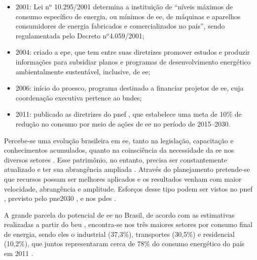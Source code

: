 \begin{itemize}
de 0,50\% da receita operacional líquida das operadoras.  Foi
realizado um investimento total em \glspl{pee} pelas concessionárias
do setor elétrico na quantia de $\text{R\$}$ 2 bilhões até o ano de
2006, onde se estima que o programa alcançou uma econômia média de
4.000 GWh/ano e retirando uma carga de ponta de consumo na ordem de
1.140 MW no período de 1998--2005;
\item 2001: Lei n$^\text{o}$ 10.295/2001 determina a instituição de
``níveis máximos de consumo específico de energia, ou mínimos de
\gls{ee}, de máquinas e aparelhos consumidores de energia fabricados e
comercializados no país'', sendo regulamentada pelo Decreto
n$^\text{o}$4.059/2001;
\item 2004: criado a \gls{epe}, que tem entre suas diretrizes promover
estudos e produzir informações para subsidiar planos e programas de
desenvolvimento energético ambientalmente sustentável, inclusive, de
\gls{ee};
\item 2006: início do \gls{proesco}, programa destinado a financiar
projetos de \gls{ee}, cuja coordenação executiva pertence ao
\gls{bndes};
\item 2011: publicado as diretrizes do \gls{pnef} \cite{pnef}, que
estabelece uma meta de 10\% de redução no consumo por meio de ações de
\gls{ee} no período de 2015--2030.
\end{itemize}

Percebe-se uma evolução brasileira em \gls{ee}, tanto na legislação,
capacitação e conhecimentos acumulados, quanto na coinsciência da
necessidade da \gls{ee} nos diversos setores \cite{pnef}.  Esse
patrimônio, no entanto, precisa ser constantemente atualizado e ter
sua abrangência ampliada \cite{pne30_eff_energ}. Através do
planejamento pretende-se que recursos possam ser melhores aplicados e
os resultados venham com maior velocidade, abrangência e amplitude.
Esforços desse tipo podem ser vistos no \gls{pnef} \cite{pnef},
previsto pelo \gls{pne2030} \cite{pne30_eff_energ}, e nos \glspl{pde}
\cite{pde_2020}.

A grande parcela do potencial de \gls{ee} no Brasil, de acordo com as
estimativas realizadas a partir do \gls{beu} \cite{beu}, encontra-se
nos três maiores setores por consumo final de energia, sendo eles o
industrial (37,3\%), transportes (30,5\%) e residencial (10,2\%), que
juntos representaram cerca de 78\% do consumo energético do país em
2011 \cite{ben2012,epe_eficiencia_2012}.

